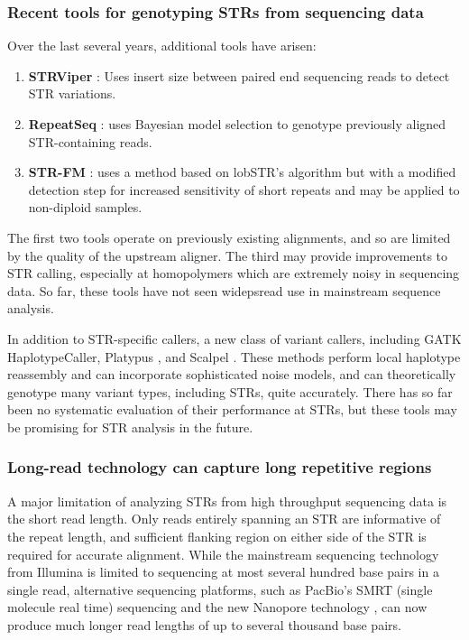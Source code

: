 \subsubsection{Recent tools for genotyping STRs from sequencing data}
Over the last several years, additional tools have arisen:

\begin{enumerate}
\item \textbf{STRViper} \cite{CaoTaskerWilladsenEtAl2014}: Uses insert size between paired end sequencing reads to detect STR variations.
\item \textbf{RepeatSeq} \cite{HighnamFranckMartinEtAl2013}: uses Bayesian model selection to genotype previously aligned STR-containing reads.
\item \textbf{STR-FM} \cite{FungtammasanAnandaHileEtAl2015}: uses a method based on lobSTR's algorithm but with a modified detection step for increased sensitivity of short repeats and may be applied to non-diploid samples.
\end{enumerate}

The first two tools operate on previously existing alignments, and so are limited by the quality of the upstream aligner. The third may provide improvements to STR calling, especially at homopolymers which are extremely noisy in sequencing data. So far, these tools have not seen widepsread use in mainstream sequence analysis.

In addition to STR-specific callers, a new class of variant callers, including GATK \cite{McKennaHannaBanksEtAl2010} HaplotypeCaller, Platypus \cite{RimmerPhanMathiesonEtAl2014}, and Scalpel \cite{NarzisiOextquotesingleRaweIossifovEtAl2014}. These methods perform local haplotype reassembly and can incorporate sophisticated noise models, and can theoretically genotype many variant types, including STRs, quite accurately. There has so far been no systematic evaluation of their performance at STRs, but these tools may be promising for STR analysis in the future.

\subsubsection{Long-read technology can capture long repetitive regions}
A major limitation of analyzing STRs from high throughput sequencing data is the short read length. Only reads entirely spanning an STR are informative of the repeat length, and sufficient flanking region on either side of the STR is required for accurate alignment. While the mainstream sequencing technology from Illumina is limited to sequencing at most several hundred base pairs in a single read, alternative sequencing platforms, such as PacBio's SMRT (single molecule real time) sequencing \cite{EidFehrGrayEtAl2009} and the new Nanopore technology \cite{ClarkeWuJayasingheEtAl2009}, can now produce much longer read lengths of up to several thousand base pairs.

